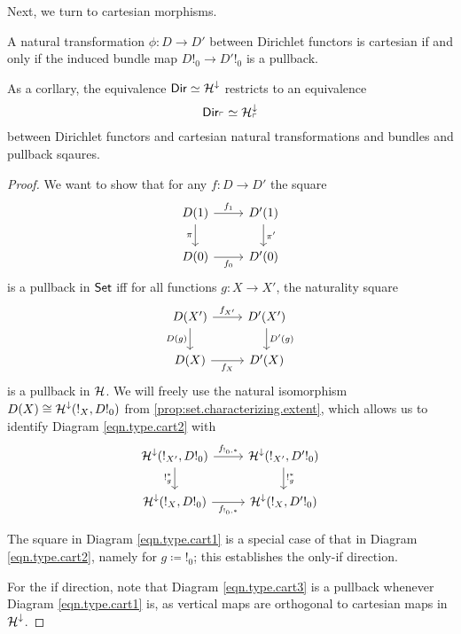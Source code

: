 Next, we turn to cartesian morphisms.
\begin{prop}\label{prop:type.dirichlet.cartesian.iff.bundle.cartesian}
A natural transformation $\phi : D \to D'$ between Dirichlet functors is
cartesian if and only if the induced bundle map $D!_0 \to D'!_0$ is a pullback.

As a corllary, the equivalence $\operatorname{\mathsf{{Dir}}} \simeq \operatorname{\mathcal{H}}^{\mathbin{\downarrow}}$ restricts to an
equivalence
$$\operatorname{\mathsf{{Dir}}}_{\ulcorner} \simeq \operatorname{\mathcal{H}}^{\mathbin{\downarrow}}_{\ulcorner}$$
between Dirichlet functors and cartesian natural transformations and bundles and
pullback sqaures.
\end{prop}
\begin{proof}
We want to show that for any $f\colon D\to D'$ the square
\begin{equation}\label{eqn.type.cart1}
\begin{tikzcd}
	D(1)\ar[r, "f_1"]\ar[d, "\pi"']&
	D'(1)\ar[d, "\pi'"]\\
	D(0)\ar[r, "f_0"']&
	D'(0)
\end{tikzcd}
\end{equation}
is a pullback in $\operatorname{\mathsf{{Set}}}$ iff for all functions $g\colon X\to X'$, the naturality square
\begin{equation}\label{eqn.type.cart2}
\begin{tikzcd}
  D(X')\ar[r, "f_{X'}"]\ar[d, "D(g)"']&
  D'(X')\ar[d, "D'(g)"]\\
  D(X)\ar[r, "f_X"']&
  D'(X)
\end{tikzcd}
\end{equation}
is a pullback in $\operatorname{\mathcal{H}}$. We will freely use the natural isomorphism
$D(X)\cong\operatorname{\mathcal{H}}^{\mathbin{\downarrow}}(!_X, D!_0)$ from
\ref{prop:set.characterizing.extent}, which allows us to identify Diagram
\ref{eqn.type.cart2} with
\begin{equation}\label{eqn.type.cart3}
\begin{tikzcd}
 \Ha^{\down}(!_{X'}, D!_0)     \ar[r, "f_{!_0,\ast}"]\ar[d, "!_g^{\ast}"']& \Ha^{\down}(!_{X'}, D'!_0)
  \ar[d, "!_{g}^{\ast}"]\\
  \Ha^{\down}(!_{X}, D!_0)\ar[r, "f_{!_0, \ast}"']&
 \Ha^{\down}(!_X, D'!_0) 
\end{tikzcd}
\end{equation}

The square in Diagram \ref{eqn.type.cart1} is a
special case of that in Diagram \ref{eqn.type.cart2}, namely for $g\coloneqq !_0$;
this establishes the only-if direction.

For the if direction, note that Diagram \ref{eqn.type.cart3} is a pullback
whenever Diagram \ref{eqn.type.cart1} is, as vertical maps are orthogonal to
cartesian maps in $\operatorname{\mathcal{H}}^{\mathbin{\downarrow}}$.
\end{proof}

